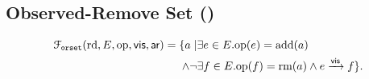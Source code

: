 
\subsection{Observed-Remove Set (\ORset{})}	\label{ss:orset}

\begin{align}
  \mathcal{F}_{\texttt{orset}}(\text{rd}, E, \text{op}, \textsf{vis}, \textsf{ar})
  = \{a \mid & \exists e \in E. \text{op}(e) = \text{add}(a) \\
  \land \lnot & \exists f \in E. \text{op}(f) = \text{rm}(a) \land e \xrightarrow{\textsf{vis}} f\}.
\end{align}

